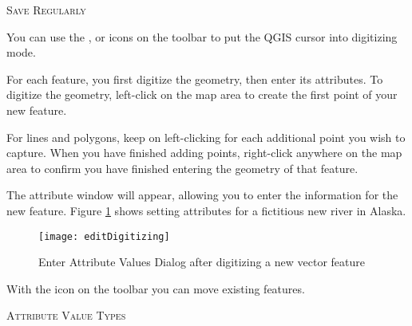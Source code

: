 \begin{Tip}[ht]\caption{\textsc{Save Regularly}}
\end{Tip}


You can use the ,
 or
 icons on the toolbar to
put the QGIS cursor into digitizing mode.  

For each feature, you first digitize the geometry, then enter its attributes.
To digitize the geometry, left-click on the map area to create the first
point of your new feature.

For lines and polygons, keep on left-clicking for each additional
point you wish to capture.  When you have finished adding points,
right-click anywhere on the map area to confirm you have finished entering
the geometry of that feature.

The attribute window will appear, allowing you to enter the information for
the new feature. Figure \ref{fig:vector_digitising} shows setting attributes
for a fictitious new river in Alaska.

\begin{figure}[ht]
   \begin{center}
   \caption{Enter Attribute Values Dialog after digitizing a new vector
   feature \nixcaption}\label{fig:vector_digitising}\smallskip
   \texttt{[image: editDigitizing]}
\end{center}  
\end{figure}

With the  icon on the toolbar
you can move existing features.

\begin{Tip}[ht]\caption{\textsc{Attribute Value Types}}
\end{Tip}


